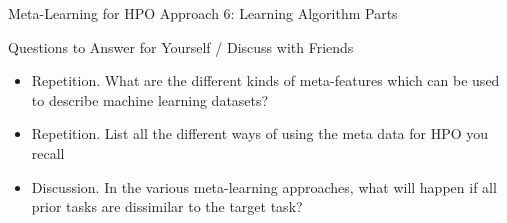 \begin{frame}[c]{Meta-Learning for HPO Approach 6: Learning Algorithm Parts}
\begin{itemize}
\end{itemize}


\end{frame}

\begin{frame}[c]{Questions to Answer for Yourself / Discuss with Friends}

\begin{itemize}
    \item \alert{Repetition.} What are the different kinds of meta-features which can be used to describe machine learning datasets?
    
    \medskip

    \item \alert{Repetition.} List all the different ways of using the meta data for HPO you recall
    \medskip

    \item \alert{Discussion.}
        In the various meta-learning approaches, what will happen if all prior tasks are dissimilar to the target task?


\end{itemize}

\end{frame}
